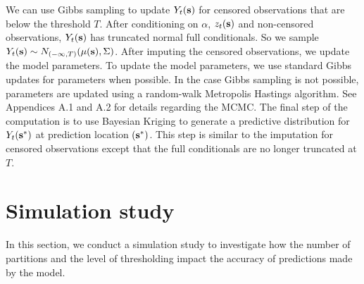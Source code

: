 \documentclass[11pt]{article}
\begin{document}
We can use Gibbs sampling to update $Y_t(\mbox{\bf s})$ for censored observations that are below the threshold $T$.
After conditioning on $\alpha$, $z_t(\mbox{\bf s})$ and non-censored observations, $Y_t(\mbox{\bf s})$ has truncated normal full conditionals.
So we sample $Y_t(\mbox{\bf s}) \sim N_{(-\infty, T)}(\mu(\mbox{\bf s}), \Sigma)$.
After imputing the censored observations, we update the model parameters.
To update the model parameters, we use standard Gibbs updates for parameters when possible.
In the case Gibbs sampling is not possible, parameters are updated using a random-walk Metropolis Hastings algorithm.
See Appendices A.1 and A.2 for details regarding the MCMC.
The final step of the computation is to use Bayesian Kriging to generate a predictive distribution for $Y_t(\mbox{\bf s}^*)$ at prediction location $(\mbox{\bf s}^*)$.
This step is similar to the imputation for censored observations except that the full conditionals are no longer truncated at $T$.

\section{Simulation study}\label{s:simstudy}
In this section, we conduct a simulation study to investigate how the number of partitions and the level of thresholding impact the accuracy of predictions made by the model.
\end{document}
